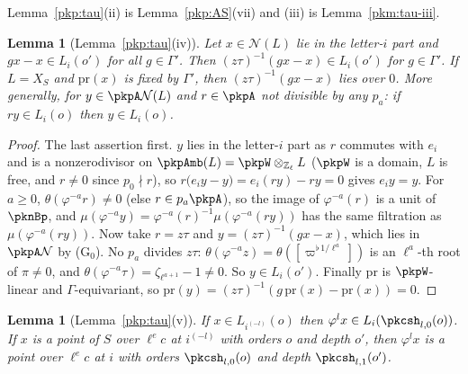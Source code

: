 \documentclass[10pt]{amsart}
\newtheorem{lemma}[theorem]{Lemma}
\theoremstyle{definition}
\theoremstyle{remark}
\newcommand{\Z}{\mathbb Z}
\begin{document}
Lemma~\ref{pkp:tau}(ii) is Lemma~\ref{pkp:AS}(vii) and (iii) is Lemma~\ref{pkm:tau-iii}.

\begin{lemma}[Lemma~\ref{pkp:tau}(iv)]\label{pkt:tau-iv}
Let $x\in\mathcal N(L)$ lie in the letter-$i$ part and $gx-x\in L_i(o')$ for all $g\in\Gamma'$. Then
$(z\tau)^{-1}(gx-x)\in L_i(o')$ for $g\in\Gamma'$. If $L=X_S$ and $\mathrm{pr}(x)$ is fixed by $\Gamma'$, then
$(z\tau)^{-1}(gx-x)$ lies over $0$. More generally, for $y\in\pkpA\mathcal N(L)$ and $r\in\pkpA$ not divisible by any $p_a$: if $ry\in
L_i(o)$ then $y\in L_i(o)$.
\end{lemma}

\begin{proof}
The last assertion first. $y$ lies in the letter-$i$ part as $r$ commutes with $e_i$ and is a nonzerodivisor on
$\pkpAmb(L)=\pkpW\otimes_{\Z_\ell}L$ ($\pkpW$ is a domain, $L$ is free, and $r\ne0$ since $p_0\nmid r$), so
$r\bigl(e_iy-y\bigr)=e_i(ry)-ry=0$ gives $e_iy=y$. For $a\ge0$, $\theta(\varphi^{-a}r)\ne0$ (else $r\in p_a\pkpA$), so the image of $\varphi^{-a}(r)$
is a unit of $\pknBp$, and $\mu(\varphi^{-a}y)=\varphi^{-a}(r)^{-1}\mu(\varphi^{-a}(ry))$ has the same filtration
as $\mu(\varphi^{-a}(ry))$. Now take $r=z\tau$ and $y=(z\tau)^{-1}(gx-x)$, which lies in $\pkpA\mathcal N$ by
(G$_0$). No $p_a$ divides $z\tau$: $\theta(\varphi^{-a}z)=\theta([\varpi^{\flat\,1/\ell^a}])$ is an
$\ell^a$-th root of $\pi\ne0$, and $\theta(\varphi^{-a}\tau)=\zeta_{\ell^{a+1}}-1\ne0$. So $y\in L_i(o')$.
Finally $\mathrm{pr}$ is $\pkpW$-linear and $\Gamma$-equivariant, so $\mathrm{pr}(y)=(z\tau)^{-1}(g\,\mathrm{pr}(x)-
\mathrm{pr}(x))=0$.
\end{proof}

\begin{lemma}[Lemma~\ref{pkp:tau}(v)]\label{pkt:tau-v}
If $x\in L_{i^{(-l)}}(o)$ then $\varphi^lx\in L_i(\pkcsh_{l,0}(o))$. If $x$ is a point of $S$ over
$\ell^ec$ at $i^{(-l)}$ with orders $o$ and depth $o'$, then $\varphi^lx$ is a point over $\ell^ec$ at $i$
with orders $\pkcsh_{l,0}(o)$ and depth $\pkcsh_{l,1}(o')$.
\end{lemma}
\end{document}

